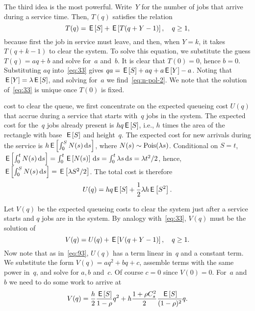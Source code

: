\documentclass[stochastic-or.tex]{subfiles}
\begin{document}
The third idea is the most powerful.
Write~$Y$ for the number of jobs that arrive during a service time.
Then, $T(q)$ satisfies the relation
\begin{equation}\label{eq:33}
  T(q) = \,\mathsf{E}\left[S\right] + \,\mathsf{E}\left[T(q+Y-1)\right],\quad q\geq 1,
\end{equation}
because first the job in service must leave, and then, when $Y=k$, it takes $T(q+k-1)$ to clear the system.
To solve this equation, we substitute the guess $T(q) = aq+b$ and solve for~$a$ and~$b$.
It is clear that $T(0)=0$, hence $b=0$.
Substituting $a q$ into~\cref{eq:33} gives $q a =\,\mathsf{E}\left[S\right] + aq + a\,\mathsf{E}\left[Y\right] - a$.
Noting that $\,\mathsf{E}\left[Y\right] = \lambda \,\mathsf{E}\left[S\right]$, 
and solving for~$a$ we find~\cref{eq:n-pol-2}.
We note that the solution of~\cref{eq:33} is unique once $T(0)$ is fixed.




 cost to clear the queue, we first concentrate on the expected queueing cost $U(q)$ that accrue during a service that starts with~$q$ jobs in the system.
The expected cost for the~$q$ jobs already present is $h q \,\mathsf{E}\left[S\right]$, i.e., $h$ times the area of the rectangle with base~$\,\mathsf{E}\left[S\right]$ and height~$q$.
The expected cost for new arrivals during the service is $h \,\mathsf{E}\left[\int_0^{S} N(s) \,\textrm{d}s\right]$, where $N(s)\sim \mathrm{Pois}(\lambda s)$.
Conditional on $S=t$, $\,\mathsf{E}\left[\int_0^{t} N(s) \,\textrm{d}s \right] = \int_{0}^{t} \,\mathsf{E}\left[N(s)\right] \,\textrm{d}s = \int_{0}^{t} \lambda s \,\textrm{d}s = \lambda t^2/2$, hence, $\,\mathsf{E}\left[\int_0^{S} N(s) \,\textrm{d}s\right] = \,\mathsf{E}\left[\lambda S^{2}/2\right]$.
The total cost is therefore
\begin{equation*}
U(q)  =  h q \,\mathsf{E}\left[S\right] +  \frac 12 \lambda h \,\mathsf{E}\left[S^2\right].
\end{equation*}

Let $V(q)$ be the expected queueing costs to clear the system just after a service starts and  $q$ jobs are in the system.
By analogy with~\cref{eq:33}, $V(q)$ must be the solution of
\begin{equation}  \label{eq:98}
  V(q) = U(q) + \,\mathsf{E}\left[V(q+Y-1)\right], \quad q\geq 1.
\end{equation}
Now note that as in~\cref{eq:93}, $U(q)$ has a term linear in~$q$ and a constant term.
We substitute the form $V(q) = aq^2 + bq+c$, assemble terms with the same power in~$q$, and solve for $a, b$ and~$c$.
Of course $c = 0$ since $V(0)=0$.
For~$a$ and~$b$ we need to do some work to arrive at
\begin{align*}
  V(q) = \frac{h}{2}\frac{\,\mathsf{E}\left[S\right]}{1-\rho} q^2 + h  \frac{ 1+ \rho C_s^2}2 \frac{\,\mathsf{E}\left[S\right]}{(1-\rho)^2} q.
\end{align*}
\end{document}
